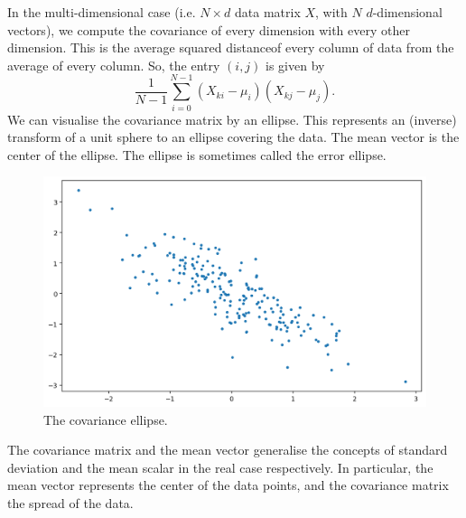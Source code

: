 \documentclass[a4paper, openany]{memoir}
\begin{document}
    In the multi-dimensional case (i.e. $N \times d$ data matrix $X$, with $N$ $d$-dimensional vectors), we compute the covariance of every dimension with every other dimension. This is the average squared distanceof every column of data from the average of every column. So, the entry $(i, j)$ is given by
    \[\frac{1}{N-1} \sum_{i=0}^{N-1} (X_{ki} - \mu_i) (X_{kj} - \mu_j).\]
    We can visualise the covariance matrix by an ellipse. This represents an (inverse) transform of a unit sphere to an ellipse covering the data. The mean vector is the center of the ellipse. The ellipse is sometimes called the error ellipse.
    \begin{figure}[H]
        \centering
        \includegraphics[scale=0.5]{src/3.20 covariance ellipse.png}
        \caption{The covariance ellipse.}
    \end{figure}

    The covariance matrix and the mean vector generalise the concepts of standard deviation and the mean scalar in the real case respectively. In particular, the mean vector represents the center of the data points, and the covariance matrix the spread of the data.
\end{document}
